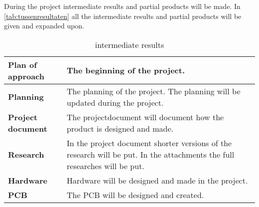 During the project intermediate results and partial products will be made. In \autoref{tab:tussenresultaten} all the intermediate results and partial products will be given and expanded upon.

\begin{table}[H]
    \centering
    \begin{tabular}{l p{10cm}}
         \bf Plan of approach & The beginning of the project. \\\hline
         \bf Planning & The planning of the project. The planning will be updated during the project.  \\\hline
         \bf Project document & The projectdocument will document how the product is designed and made. \\\hline 
         \bf Research & In the project document shorter versions of the research will be put. In the attachments the full researches will be put.\\\hline
         \bf Hardware & Hardware will be designed and made in the project. \\\hline
         \bf PCB & The PCB will be designed and created.\\
    \end{tabular}
    \caption{intermediate results}
    \label{tab:tussenresultaten}
\end{table}